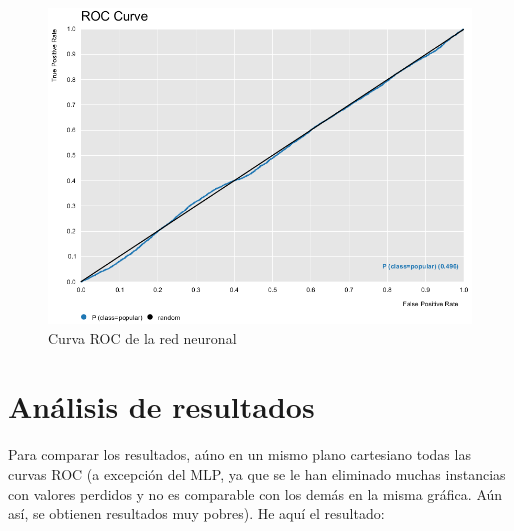 \begin{figure}[H] %
	\centering
	\includegraphics[scale=0.36]{roc-rn-p.png}  %
	\caption{Curva ROC de la red neuronal} 
	\label{fig:rocrn-p}
\end{figure}




\section{Análisis de resultados}

Para comparar los resultados, aúno en un mismo plano cartesiano todas las curvas ROC (a excepción del MLP, ya que se le han eliminado muchas instancias con valores perdidos y no es comparable con los demás en la misma gráfica. Aún así, se obtienen resultados muy pobres). He aquí el resultado:

